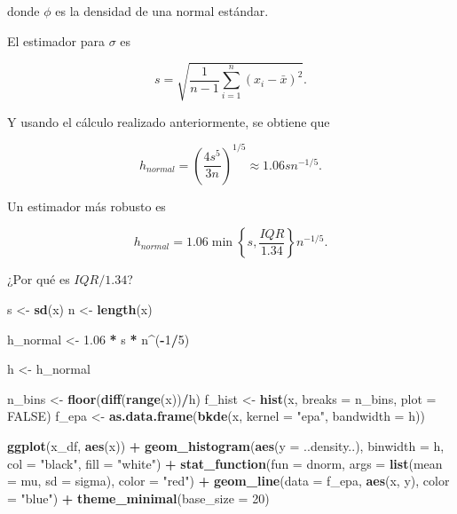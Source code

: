 \documentclass[
  12pt,
]{book}
\newenvironment{Shaded}{\begin{snugshade}}{\end{snugshade}}
\newcommand{\DataTypeTok}[1]{\textcolor[rgb]{0.13,0.29,0.53}{#1}}
\newcommand{\DecValTok}[1]{\textcolor[rgb]{0.00,0.00,0.81}{#1}}
\newcommand{\FloatTok}[1]{\textcolor[rgb]{0.00,0.00,0.81}{#1}}
\newcommand{\KeywordTok}[1]{\textcolor[rgb]{0.13,0.29,0.53}{\textbf{#1}}}
\newcommand{\NormalTok}[1]{#1}
\newcommand{\OperatorTok}[1]{\textcolor[rgb]{0.81,0.36,0.00}{\textbf{#1}}}
\newcommand{\OtherTok}[1]{\textcolor[rgb]{0.56,0.35,0.01}{#1}}
\newcommand{\StringTok}[1]{\textcolor[rgb]{0.31,0.60,0.02}{#1}}
\theoremstyle{definition}
\theoremstyle{definition}
\theoremstyle{definition}
\theoremstyle{remark}
\begin{document}
donde \(\phi\) es la densidad de una normal estándar.

El estimador para \(\sigma\) es

\[
s = \sqrt{\frac{1}{n-1} \sum_{i=1}^n (x_i - \bar{x})^2  }.
\]

Y usando el cálculo realizado anteriormente, se obtiene que

\[
h_{normal} = \left( \frac{4 s^5}{3n} \right)^{1/5} \approx 1.06 s n^{-1/5}.
\]

Un estimador más robusto es

\[
h_{normal} =  1.06 \min \left\{ s , \frac{IQR}{1.34} \right\} n^{-1/5}.
\]

¿Por qué es \(IQR / 1.34\)?

\begin{Shaded}
\begin{Highlighting}[]
\NormalTok{s <-}\StringTok{ }\KeywordTok{sd}\NormalTok{(x)}
\NormalTok{n <-}\StringTok{ }\KeywordTok{length}\NormalTok{(x)}
\end{Highlighting}
\end{Shaded}

\begin{Shaded}
\begin{Highlighting}[]
\NormalTok{h_normal <-}\StringTok{ }\FloatTok{1.06} \OperatorTok{*}\StringTok{ }\NormalTok{s }\OperatorTok{*}\StringTok{ }\NormalTok{n}\OperatorTok{^}\NormalTok{(}\OperatorTok{-}\DecValTok{1}\OperatorTok{/}\DecValTok{5}\NormalTok{)}

\NormalTok{h <-}\StringTok{ }\NormalTok{h_normal}

\NormalTok{n_bins <-}\StringTok{ }\KeywordTok{floor}\NormalTok{(}\KeywordTok{diff}\NormalTok{(}\KeywordTok{range}\NormalTok{(x))}\OperatorTok{/}\NormalTok{h)}
\NormalTok{f_hist <-}\StringTok{ }\KeywordTok{hist}\NormalTok{(x, }\DataTypeTok{breaks =}\NormalTok{ n_bins, }\DataTypeTok{plot =} \OtherTok{FALSE}\NormalTok{)}
\NormalTok{f_epa <-}\StringTok{ }\KeywordTok{as.data.frame}\NormalTok{(}\KeywordTok{bkde}\NormalTok{(x, }\DataTypeTok{kernel =} \StringTok{"epa"}\NormalTok{, }\DataTypeTok{bandwidth =}\NormalTok{ h))}

\KeywordTok{ggplot}\NormalTok{(x_df, }\KeywordTok{aes}\NormalTok{(x)) }\OperatorTok{+}\StringTok{ }\KeywordTok{geom_histogram}\NormalTok{(}\KeywordTok{aes}\NormalTok{(}\DataTypeTok{y =}\NormalTok{ ..density..), }
    \DataTypeTok{binwidth =}\NormalTok{ h, }\DataTypeTok{col =} \StringTok{"black"}\NormalTok{, }\DataTypeTok{fill =} \StringTok{"white"}\NormalTok{) }\OperatorTok{+}\StringTok{ }
\StringTok{    }\KeywordTok{stat_function}\NormalTok{(}\DataTypeTok{fun =}\NormalTok{ dnorm, }\DataTypeTok{args =} \KeywordTok{list}\NormalTok{(}\DataTypeTok{mean =}\NormalTok{ mu, }
        \DataTypeTok{sd =}\NormalTok{ sigma), }\DataTypeTok{color =} \StringTok{"red"}\NormalTok{) }\OperatorTok{+}\StringTok{ }\KeywordTok{geom_line}\NormalTok{(}\DataTypeTok{data =}\NormalTok{ f_epa, }
    \KeywordTok{aes}\NormalTok{(x, y), }\DataTypeTok{color =} \StringTok{"blue"}\NormalTok{) }\OperatorTok{+}\StringTok{ }\KeywordTok{theme_minimal}\NormalTok{(}\DataTypeTok{base_size =} \DecValTok{20}\NormalTok{)}
\end{Highlighting}
\end{Shaded}
\end{document}
